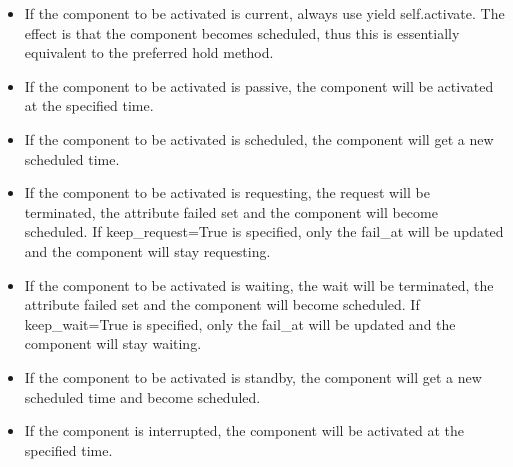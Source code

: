 \documentclass[letterpaper,10pt,english]{sphinxmanual}
\begin{document}
%
\begin{sphinxVerbatim}[commandchars=\\\{\}]
    
  
    
  
\end{sphinxVerbatim}
\begin{itemize}
\item {} 
If the component to be activated is current, always use yield self.activate. The effect is that the
component becomes scheduled, thus this is essentially equivalent to the preferred hold method.

\item {} 
If the component to be activated is passive, the component will be activated at the specified time.

\item {} 
If the component to be activated is scheduled, the component will get a new scheduled time.

\item {} 
If the component to be activated is requesting, the request will be
terminated, the attribute failed set and the component will become scheduled. If keep\_request=True
is specified, only the fail\_at will be updated and the component will stay requesting.

\item {} 
If the component to be activated is waiting, the wait will be
terminated, the attribute failed set and the component will become scheduled. If keep\_wait=True
is specified, only the fail\_at will be updated and the component will stay waiting.

\item {} 
If the component to be activated is standby, the component will get a new scheduled time and become
scheduled.

\item {} 
If the component is interrupted, the component will be activated at the specified time.

\end{itemize}
\end{document}
